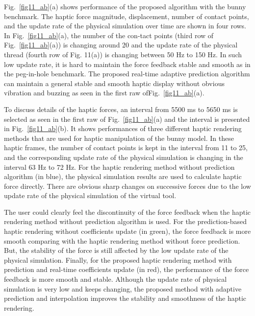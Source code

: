\documentclass[10pt,journal,cspaper,compsoc]{IEEEtran}
\begin{document}
Fig.~\ref{fig11_ab}(a) shows performance of the proposed algorithm with the bunny benchmark. The haptic force magnitude, displacement, number of contact points, and the update rate of the physical simulation over time are shown in four rows. In Fig.~\ref{fig11_ab}(a), the number of the con-tact points (third row of Fig.~\ref{fig11_ab}(a)) is changing around 20 and the update rate of the physical thread (fourth row of Fig. 11(a)) is changing between 50 Hz to 150 Hz. In such low update rate, it is hard to maintain the force feedback stable and smooth as in the peg-in-hole benchmark. The proposed real-time adaptive prediction algorithm can maintain a general stable and smooth haptic display without obvious vibration and buzzing as seen in the first raw ofFig.~\ref{fig11_ab}(a).

To discuss details of the haptic forces, an interval from 5500 ms to 5650 ms is selected as seen in the first raw of Fig.~\ref{fig11_ab}(a) and the interval is presented in Fig.~\ref{fig11_ab}(b). It shows performances of three different haptic rendering methods that are used for haptic manipulation of the bunny model. In these haptic frames, the number of contact points is kept in the interval from 11 to 25, and the corresponding update rate of the physical simulation is changing in the interval 63 Hz to 72 Hz. For the haptic rendering method without prediction algorithm (in blue), the physical simulation results are used to calculate haptic force directly. There are obvious sharp changes on successive forces due to the low update rate of the physical simulation of the virtual tool.

The user could clearly feel the discontinuity of the force feedback when the haptic rendering method without prediction algorithm is used. For the prediction-based haptic rendering without coefficients update (in green), the force feedback is more smooth comparing with the haptic rendering method without force prediction. But, the stability of the force is still affected by the low update rate of the physical simulation. Finally, for the proposed haptic rendering method with prediction and real-time coefficients update (in red), the performance of the force feedback is more smooth and stable. Although the update rate of physical simulation is very low and keeps changing, the proposed method with adaptive prediction and interpolation improves the stability and smoothness of the haptic rendering.
\end{document}
